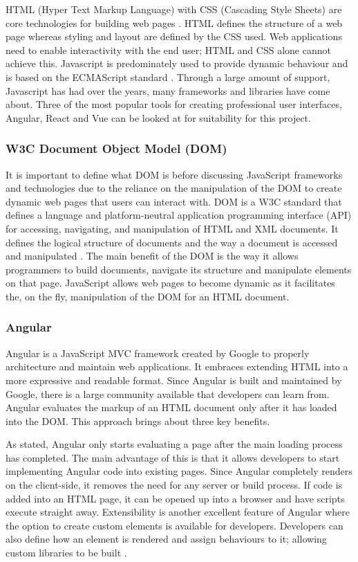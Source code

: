 HTML (Hyper Text Markup Language) with CSS (Cascading Style Sheets) are core technologies for building web pages \cite{w3c_html_css}.
HTML defines the structure of a web page whereas styling and layout are defined by the CSS used.
Web applications need to enable interactivity with the end user; HTML and CSS alone cannot achieve this.
Javascript is predominately used to provide dynamic behaviour and is based on the ECMAScript standard \cite{stefanov2010javascript}.
Through a large amount of support, Javascript has had over the years, many frameworks and libraries have come about.
Three of the most popular tools for creating professional user interfaces, Angular, React and Vue \cite{stateofjs_2018} can be looked at for suitability for this project.

\subsubsection{W3C Document Object Model (DOM)}
It is important to define what DOM is before discussing JavaScript frameworks and technologies due to the reliance on the manipulation of the DOM to create dynamic web pages that users can interact with.
DOM is a W3C standard that defines a language and platform-neutral application programming interface (API) for accessing, navigating, and 
manipulation of HTML and XML documents.
It defines the logical structure of documents and the way a document is accessed and manipulated \cite{wood1999programming}.
The main benefit of the DOM is the way it allows programmers to build documents, navigate its structure and manipulate elements on that page.
JavaScript allows web pages to become dynamic as it facilitates the, on the fly, manipulation of the DOM for an HTML document.

\subsubsection{Angular}
Angular is a JavaScript MVC framework created by Google to properly architecture and maintain web applications.
It embraces extending HTML into a more expressive and readable format. 
Since Angular is built and maintained by Google, there is a large community available that developers can learn from.
Angular evaluates the markup of an HTML document only after it has loaded into the DOM.
This approach brings about three key benefits.

As stated, Angular only starts evaluating a page after the main loading process has completed.
The main advantage of this is that it allows developers to start implementing Angular code into existing pages.
Since Angular completely renders on the client-side, it removes the need for any server or build process. 
If code is added into an HTML page, it can be opened up into a browser and have scripts execute straight away.
Extensibility is another excellent feature of Angular where the option to create custom elements is available for developers.
Developers can also define how an element is rendered and assign behaviours to it; allowing custom libraries to be built \cite{jain2015angularjs}.

